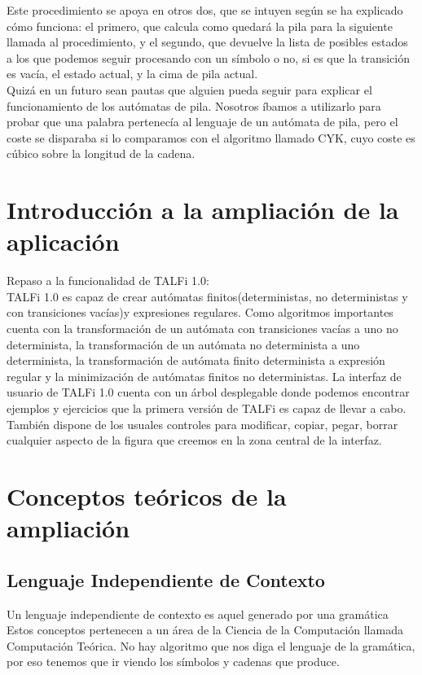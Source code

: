 \documentclass[12pt,a4paper,spanish]{book}
\begin{document}
Este procedimiento se apoya en otros dos, que se intuyen seg\'un se ha explicado c\'omo funciona: el primero, que calcula como quedar\'a la pila para la siguiente llamada al procedimiento, y el segundo, que devuelve la lista de posibles estados a los que podemos seguir procesando con un s\'imbolo o no, si es que la transici\'on es vac\'ia, el estado actual, y la cima de pila actual.\\

Quiz\'a en un futuro sean pautas que alguien pueda seguir para explicar el funcionamiento de los aut\'omatas de pila. Nosotros \'ibamos a utilizarlo para probar que una palabra pertenec\'ia al lenguaje de un aut\'omata de pila, pero el coste se disparaba si lo comparamos con el algoritmo llamado CYK, cuyo coste es c\'ubico sobre la longitud de la cadena.

\newpage
\section{Introducci\'on a la ampliaci\'on de la aplicaci\'on}
Repaso a la funcionalidad de TALFi 1.0: \\

TALFi 1.0 es capaz de crear aut\'omatas finitos(deterministas, no deterministas y con transiciones vac\'ias)y expresiones regulares.
Como algoritmos importantes cuenta con la transformaci\'on de un aut\'omata con transiciones vac\'ias a uno no determinista, la transformaci\'on de un aut\'omata no determinista a uno determinista, la transformaci\'on de aut\'omata finito determinista a expresi\'on regular y la minimizaci\'on de aut\'omatas finitos no deterministas.
La interfaz de usuario de TALFi 1.0 cuenta con un \'arbol desplegable donde podemos encontrar ejemplos y ejercicios que la primera versi\'on de TALFi es capaz de llevar a cabo. Tambi\'en dispone de los usuales controles para modificar, copiar, pegar, borrar cualquier aspecto de la figura que creemos en la zona central de la interfaz.

\newpage
\section{Conceptos te\'oricos de la ampliaci\'on}
\subsection{Lenguaje Independiente de Contexto}
Un lenguaje independiente de contexto es aquel generado por una gram\'atica  Estos conceptos pertenecen a un \'area de la Ciencia de la
Computaci\'on llamada Computaci\'on Te\'orica. No hay algoritmo que nos diga el lenguaje
de la gram\'atica, por eso tenemos que ir viendo los s\'imbolos y cadenas que produce.
\end{document}
